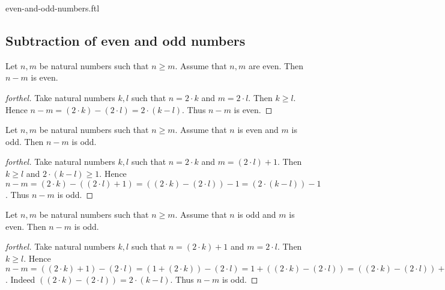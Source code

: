 \documentclass{naproche-library}
\begin{document}
\begin{smodule}{even-and-odd-numbers.ftl}
  \subsection{Subtraction of even and odd numbers}

  \begin{proposition}[forthel,id=ARITHMETIC_15_8748569852145203,printid]
    Let $n, m$ be natural numbers such that $n \geq m$.
    Assume that $n, m$ are even.
    Then $n - m$ is even.
  \end{proposition}
  \begin{proof}[forthel]
    Take natural numbers $k, l$ such that $n = 2 \cdot k$ and $m = 2 \cdot l$.
    Then $k \geq l$.
    Hence $n - m
      = (2 \cdot k) - (2 \cdot l)
      = 2 \cdot (k - l)$.
    Thus $n - m$ is even.
  \end{proof}

  \begin{proposition}[forthel,id=ARITHMETIC_15_0125412036589958,printid]
    Let $n, m$ be natural numbers such that $n \geq m$.
    Assume that $n$ is even and $m$ is odd.
    Then $n - m$ is odd.
  \end{proposition}
  \begin{proof}[forthel]
    Take natural numbers $k, l$ such that $n = 2 \cdot k$ and $m = (2 \cdot l) + 1$.
    Then $k \geq l$ and $2 \cdot (k - l) \geq 1$.
    Hence $n - m
      = (2 \cdot k) - ((2 \cdot l) + 1)
      = ((2 \cdot k) - (2 \cdot l)) - 1
      = (2 \cdot (k - l)) - 1$.
    Thus $n - m$ is odd.
  \end{proof}

  \begin{corollary}[forthel,id=ARITHMETIC_15_1021458745896523,printid]
    Let $n, m$ be natural numbers such that $n \geq m$.
    Assume that $n$ is odd and $m$ is even.
    Then $n - m$ is odd.
  \end{corollary}
  \begin{proof}[forthel]
    Take natural numbers $k, l$ such that $n = (2 \cdot k) + 1$ and $m = 2 \cdot l$.
    Then $k \geq l$.
    Hence $n - m
      = ((2 \cdot k) + 1) - (2 \cdot l)
      = (1 + (2 \cdot k)) - (2 \cdot l)
      = 1 + ((2 \cdot k) - (2 \cdot l))
      = ((2 \cdot k) - (2 \cdot l)) + 1
      = (2 \cdot (k - l)) + 1$.
    Indeed $((2 \cdot k) - (2 \cdot l)) = 2 \cdot (k - l)$. %
    Thus $n - m$ is odd.
  \end{proof}


\end{smodule}
\end{document}
